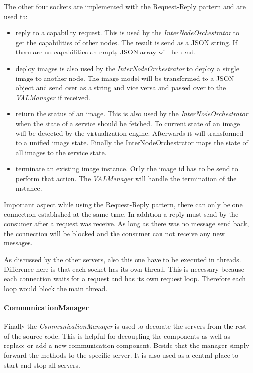 The other four sockets are implemented with the Request-Reply pattern and are used to:
\begin{itemize}
  \item reply to a capability request.
  This is used by the \textit{InterNodeOrchestrator} to get the capabilities of other nodes.
  The result is send as a \ac{JSON} string.
  If there are no capabilities an empty \ac{JSON} array will be send.
  \item deploy images is also used by the \textit{InterNodeOrchestrator} to deploy a single image to another node.
  The image model will be transformed to a \ac{JSON} object and send over as a string and vice versa and passed over to the \textit{VALManager} if received.
  \item return the status of an image. This is also used by the \textit{InterNodeOrchestrator} when the state of a service should be fetched. To current state of an image will be detected by the virtualization engine. Afterwards it will transformed to a unified image state. Finally the InterNodeOrchestrator maps the state of all images to the service state.
  \item terminate an existing image instance.
  Only the image id has to be send to perform that action.
  The \textit{VALManager} will handle the termination of the instance.
\end{itemize}
Important aspect while using the Request-Reply pattern, there can only be one connection established at the same time.
In addition a reply must send by the consumer after a request was receive.
As long as there was no message send back, the connection will be blocked and the consumer can not receive any new messages.

As discussed by the other servers, also this one have to be executed in threads.
Difference here is that each socket has its own thread.
This is necessary because each connection waits for a request and has its own request loop.
Therefore each loop would block the main thread.

\paragraph{CommunicationManager}
Finally the \textit{CommunicationManager} is used to decorate the servers from the rest of the source code.
This is helpful for decoupling the components as well as replace or add a new communication component.
Beside that the manager simply forward the methods to the specific server.
It is also used as a central place to start and stop all servers.


